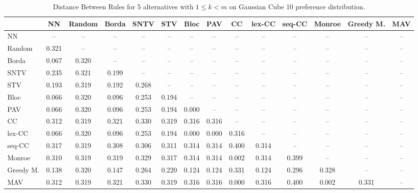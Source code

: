 
\begin{table*}
\centering
\begin{tabular}{lccccccccccccc}
\toprule
 & NN & Random & Borda & SNTV & STV & Bloc & PAV & CC & lex-CC & seq-CC & Monroe & Greedy M. & MAV \\
\midrule
NN & -- & -- & -- & -- & -- & -- & -- & -- & -- & -- & -- & -- & -- \\
Random & 0.321 & -- & -- & -- & -- & -- & -- & -- & -- & -- & -- & -- & -- \\
Borda & 0.067 & 0.320 & -- & -- & -- & -- & -- & -- & -- & -- & -- & -- & -- \\
SNTV & 0.235 & 0.321 & 0.199 & -- & -- & -- & -- & -- & -- & -- & -- & -- & -- \\
STV & 0.193 & 0.319 & 0.192 & 0.268 & -- & -- & -- & -- & -- & -- & -- & -- & -- \\
Bloc & 0.066 & 0.320 & 0.096 & 0.253 & 0.194 & -- & -- & -- & -- & -- & -- & -- & -- \\
PAV & 0.066 & 0.320 & 0.096 & 0.253 & 0.194 & 0.000 & -- & -- & -- & -- & -- & -- & -- \\
CC & 0.312 & 0.319 & 0.321 & 0.330 & 0.319 & 0.316 & 0.316 & -- & -- & -- & -- & -- & -- \\
lex-CC & 0.066 & 0.320 & 0.096 & 0.253 & 0.194 & 0.000 & 0.000 & 0.316 & -- & -- & -- & -- & -- \\
seq-CC & 0.317 & 0.319 & 0.308 & 0.306 & 0.311 & 0.314 & 0.314 & 0.400 & 0.314 & -- & -- & -- & -- \\
Monroe & 0.310 & 0.319 & 0.319 & 0.329 & 0.317 & 0.314 & 0.314 & 0.002 & 0.314 & 0.399 & -- & -- & -- \\
Greedy M. & 0.138 & 0.320 & 0.147 & 0.264 & 0.220 & 0.124 & 0.124 & 0.331 & 0.124 & 0.296 & 0.328 & -- & -- \\
MAV & 0.312 & 0.319 & 0.321 & 0.330 & 0.319 & 0.316 & 0.316 & 0.000 & 0.316 & 0.400 & 0.002 & 0.331 & -- \\
\bottomrule
\end{tabular}

\caption{Distance Between Rules for 5 alternatives with $1 \leq k < m$ on Gaussian Cube 10 preference distribution.}
\end{table*}
